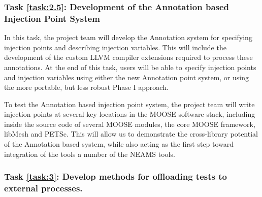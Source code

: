 \setcounter{taskCount}{0}

\label{task:2.5}
\subsubsection{Task \ref{task:2.5}: Development of the Annotation based Injection Point System  }

In this task, the project team will develop the Annotation system for specifying injection points and describing injection variables. This will include the development of
the custom LLVM compiler extensions required to process these annotations. At the end of this task, users will be able to specify injection points and injection variables using either the new Annotation point system, or using the more portable, but less robust Phase I approach. 

To test the Annotation based injection point system, the project team will write injection points at several key locations in the MOOSE software stack, including inside the source code of several MOOSE modules, the core MOOSE framework, libMesh and PETSc. This will allow us to demonstrate the cross-library potential of the Annotation based system, while also acting as the first step toward integration of the tools a number of the NEAMS tools. 



\label{task:3}
\subsubsection{Task \ref{task:3}: Develop methods for offloading tests to external processes. }



